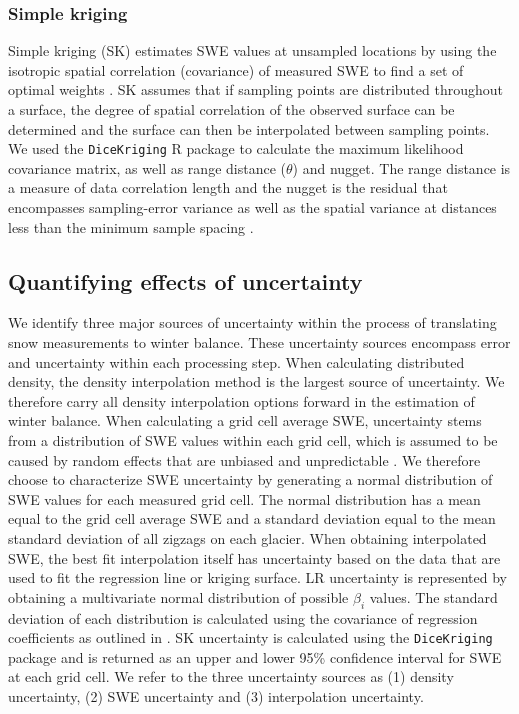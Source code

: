 \documentclass[twocolumn, letterpaper]{igs}
\begin{document}
\subsubsection{Simple kriging}

Simple kriging (SK) estimates SWE values at unsampled locations by using the isotropic spatial correlation (covariance) of measured SWE to find a set of optimal weights \citep{Davis1986, Li2008}. SK assumes that if sampling points are distributed throughout a surface, the degree of spatial correlation of the observed surface can be determined and the surface can then be interpolated between sampling points. We used the \texttt{DiceKriging} R package \citep{Roustant2012} to calculate the maximum likelihood covariance matrix, as well as range distance ($\theta$) and nugget. The range distance is a measure of data correlation length and the nugget is the residual that encompasses sampling-error variance as well as the spatial variance at distances less than the minimum sample spacing \citep{Li2008}. 

\subsection{Quantifying effects of uncertainty}

We identify three major sources of uncertainty within the process of translating snow measurements to winter balance. These uncertainty sources encompass error and uncertainty within each processing step. When calculating distributed density, the density interpolation method is the largest source of uncertainty. We therefore carry all density interpolation options forward in the estimation of winter balance. When calculating a grid cell average SWE, uncertainty stems from a distribution of SWE values within each grid cell, which is assumed to be caused by random effects that are unbiased and unpredictable \citep{Watson2006}. We therefore choose to characterize SWE uncertainty by generating a normal distribution of SWE values for each measured grid cell. The normal distribution has a mean equal to the grid cell average SWE and a standard deviation equal to the mean standard deviation of all zigzags on each glacier. When obtaining interpolated SWE, the best fit interpolation itself has uncertainty based on the data that are used to fit the regression line or kriging surface. LR uncertainty is represented by obtaining a multivariate normal distribution of possible $\beta_i$ values. The standard deviation of each distribution is calculated using the covariance of regression coefficients as outlined in \cite{Bagos2015}. SK uncertainty is calculated using the \texttt{DiceKriging} package and is returned as an upper and lower 95\% confidence interval for SWE at each grid cell. We refer to the three uncertainty sources as (1) density uncertainty, (2) SWE uncertainty and (3) interpolation uncertainty. 
\end{document}
